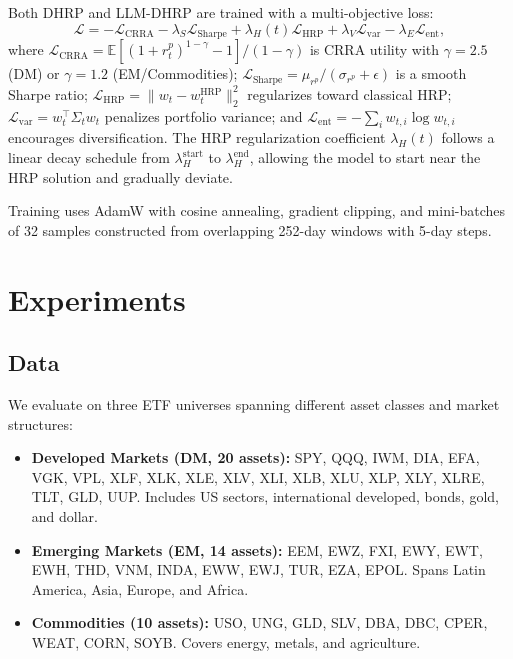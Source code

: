 \documentclass[11pt]{article}
\begin{document}
Both DHRP and LLM-DHRP are trained with a multi-objective loss:
\begin{equation}
    \mathcal{L} = -\mathcal{L}_{\text{CRRA}} - \lambda_S \mathcal{L}_{\text{Sharpe}} + \lambda_H(t) \mathcal{L}_{\text{HRP}} + \lambda_V \mathcal{L}_{\text{var}} - \lambda_E \mathcal{L}_{\text{ent}},
\end{equation}
where $\mathcal{L}_{\text{CRRA}} = \mathbb{E}[(1 + r^p_t)^{1-\gamma} - 1]/(1-\gamma)$ is CRRA utility with $\gamma = 2.5$ (DM) or $\gamma = 1.2$ (EM/Commodities); $\mathcal{L}_{\text{Sharpe}} = \mu_{r^p}/(\sigma_{r^p} + \epsilon)$ is a smooth Sharpe ratio; $\mathcal{L}_{\text{HRP}} = \|w_t - w_t^{\text{HRP}}\|_2^2$ regularizes toward classical HRP; $\mathcal{L}_{\text{var}} = w_t^\top \Sigma_t w_t$ penalizes portfolio variance; and $\mathcal{L}_{\text{ent}} = -\sum_i w_{t,i} \log w_{t,i}$ encourages diversification. The HRP regularization coefficient $\lambda_H(t)$ follows a linear decay schedule from $\lambda_H^{\text{start}}$ to $\lambda_H^{\text{end}}$, allowing the model to start near the HRP solution and gradually deviate.

Training uses AdamW with cosine annealing, gradient clipping, and mini-batches of 32 samples constructed from overlapping 252-day windows with 5-day steps.

\section{Experiments}

\subsection{Data}

We evaluate on three ETF universes spanning different asset classes and market structures:

\begin{itemize}
    \item \textbf{Developed Markets (DM, 20 assets):} SPY, QQQ, IWM, DIA, EFA, VGK, VPL, XLF, XLK, XLE, XLV, XLI, XLB, XLU, XLP, XLY, XLRE, TLT, GLD, UUP. Includes US sectors, international developed, bonds, gold, and dollar.
    \item \textbf{Emerging Markets (EM, 14 assets):} EEM, EWZ, FXI, EWY, EWT, EWH, THD, VNM, INDA, EWW, EWJ, TUR, EZA, EPOL. Spans Latin America, Asia, Europe, and Africa.
    \item \textbf{Commodities (10 assets):} USO, UNG, GLD, SLV, DBA, DBC, CPER, WEAT, CORN, SOYB. Covers energy, metals, and agriculture.
\end{itemize}
\end{document}
